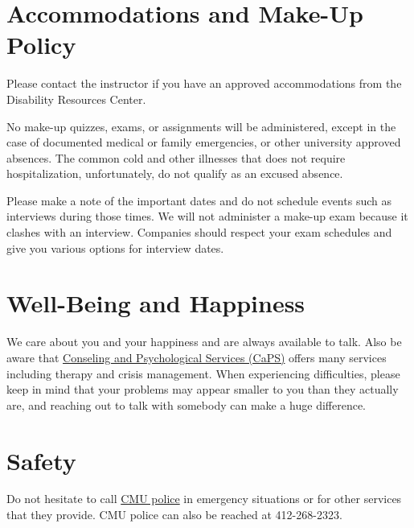 


\section{Accommodations and Make-Up Policy}

\begin{gram}
Please contact the instructor if you have an  approved accommodations from the Disability Resources Center. 

No make-up quizzes, exams, or assignments will be administered, except in the case of documented medical or family emergencies, or other university approved absences. The common cold and other illnesses that does not require hospitalization, unfortunately, do not qualify as an excused absence.

Please make a note of the important dates and do not schedule events such as interviews during those times. We will not administer a make-up exam because it clashes with an interview. Companies should respect your exam schedules and give you various options for interview dates.
\end{gram}
 
\section{Well-Being and Happiness}
\begin{gram}
We care about you and  your happiness and are  always available to talk.
%
Also be aware that 
%
\href{http://www.cmu.edu/counseling/}{Conseling and Psychological Services (CaPS)}
%
offers many services including therapy and crisis management. 
%
When experiencing difficulties, please keep in mind that your problems
may appear smaller to you than they actually are, and reaching out to talk with somebody can make a huge difference.
%
\end{gram}

\section{Safety}

Do not hesitate to call 
%
\href{https://www.cmu.edu/police/}{CMU police}
%
in emergency situations or for other services that they provide.
%
CMU police can also be reached at 412-268-2323.
%
 
